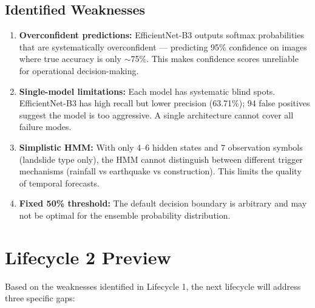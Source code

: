 \documentclass[11pt]{article}
\begin{document}
\subsection{Identified Weaknesses}

\begin{enumerate}
    \item \textbf{Overconfident predictions:} EfficientNet-B3 outputs softmax probabilities that are systematically overconfident --- predicting 95\% confidence on images where true accuracy is only $\sim$75\%. This makes confidence scores unreliable for operational decision-making.
    \item \textbf{Single-model limitations:} Each model has systematic blind spots. EfficientNet-B3 has high recall but lower precision (63.71\%); 94 false positives suggest the model is too aggressive. A single architecture cannot cover all failure modes.
    \item \textbf{Simplistic HMM:} With only 4--6 hidden states and 7 observation symbols (landslide type only), the HMM cannot distinguish between different trigger mechanisms (rainfall vs earthquake vs construction). This limits the quality of temporal forecasts.
    \item \textbf{Fixed 50\% threshold:} The default decision boundary is arbitrary and may not be optimal for the ensemble probability distribution.
\end{enumerate}

\section{Lifecycle 2 Preview}

Based on the weaknesses identified in Lifecycle 1, the next lifecycle will address three specific gaps:
\end{document}
